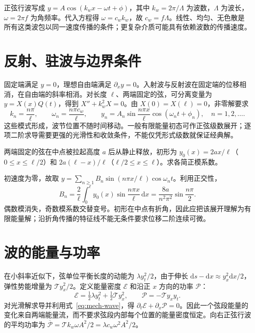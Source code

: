 \documentclass[UTF8,12pt,a4paper,fontset=fandol]{ctexbook}
\begin{document}
正弦行波写成 $y=A\cos(k_wx-\omega t+\phi)$，其中 $k_w=2\pi/\Lambda$ 为波数，$\Lambda$ 为波长，$\omega=2\pi f$ 为角频率。代入方程得 $\omega=c_wk_w$，故 $c_w=f\Lambda$。线性、均匀、无色散是所有这类波包以同一速度传播的条件；更复杂介质可能具有依赖波数的传播速度。

\section{反射、驻波与边界条件}
固定端满足 $y=0$，理想自由端满足 $\partial_xy=0$。入射波与反射波在固定端的位移相消，在自由端的斜率相消。对长度 $\ell$、两端固定的弦，可分离变量为 $y=X(x)Q(t)$，得到 $X''+k_w^2X=0$。由 $X(0)=X(\ell)=0$，非零解要求
\begin{equation}
 k_n=\frac{n\pi}{\ell},\qquad \omega_n=\frac{n\pi c_w}{\ell},\qquad
 y_n=A_n\sin\frac{n\pi x}{\ell}\cos(\omega_nt+\phi_n),\quad n=1,2,\ldots.
 \label{eq:mech-string-modes}
\end{equation}
这些模式形成，波节位置不随时间移动。一般有限能量初态可作正弦级数展开；逐项二阶求导需要更强的光滑性和收敛条件，不能仅凭形式级数就保证经典解。

\begin{example}[拨弦初态的模态展开]
两端固定的弦在中点被拉起高度 $a$ 后从静止释放，初形为 $y_0(x)=2ax/\ell$（$0\le x\le\ell/2$）和 $2a(\ell-x)/\ell$（$\ell/2\le x\le\ell$）。求各简正模系数。
\end{example}
\begin{solve}
初速度为零，故取 $y=\sum_{n\ge1}B_n\sin(n\pi x/\ell)\cos\omega_nt$。利用正交性，
\[
 B_n=\frac2\ell\int_0^\ell y_0(x)\sin\frac{n\pi x}{\ell}\,\mathrm dx
 =\frac{8a}{n^2\pi^2}\sin\frac{n\pi}2.
\]
偶数模消失，奇数模系数交替变号。初形在中点有折角，因此应把该展开理解为有限能量解；沿折角传播的特征线不能无条件要求位移二阶连续可微。
\end{solve}

\section{波的能量与功率}
在小斜率近似下，弦单位平衡长度的动能为 $\lambda y_t^2/2$，由于伸长 $\mathrm ds-\mathrm dx\approx y_x^2\mathrm dx/2$，弹性势能增量为 $\mathcal T y_x^2/2$。定义能量密度 $\mathcal E$ 和沿正 $x$ 方向的功率 $\mathcal P$：
\[
 \mathcal E=\tfrac12\lambda y_t^2+\tfrac12\mathcal T y_x^2,\qquad
 \mathcal P=-\mathcal T y_xy_t.
\]
对光滑解求导并利用式~\eqref{eq:mech-wave}，得 $\partial_t\mathcal E+\partial_x\mathcal P=0$。因此一个弦段能量的变化来自两端能量流，而不要求弦段内部每个位置的能量密度恒定。向右正弦行波的平均功率为 $\overline{\mathcal P}=\mathcal T k_w\omega A^2/2=\lambda c_w\omega^2A^2/2$。
\end{document}

